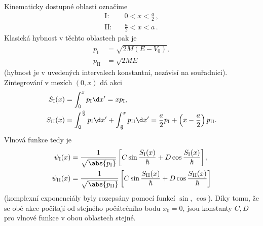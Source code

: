 \begin{solution}
	Kinematicky dostupné oblasti označíme
	\begin{align}
		\text{I:} & \quad 0<x<\frac{a}{2}\,, \nonumber\\
		\text{II:} & \quad \frac{a}{2}<x<a\,.\nonumber
	\end{align}
	Klasická hybnost v těchto oblastech pak je
    \begin{subequations}
        \begin{align}
            p_{\mathrm{I}}&=\sqrt{2M\left(E-V_{0}\right)},\\
            p_{\mathrm{II}}&=\sqrt{2ME}
        \end{align}            
    \end{subequations}
	(hybnost je v uvedených intervalech konstantní, nezávisí na souřadnici).
	Zintegrování v mezích $(0,x)$ dá akci
    \begin{subequations}
        \begin{align}
            S_{\mathrm{I}}(x)&=\int_{0}^{x}p_{\mathrm{I}}\d x'=xp_{\mathrm{I}},\\
            S_{\mathrm{II}}(x)
                &=\int_{0}^{\frac{a}{2}}p_{\mathrm{I}}\d x'+\int_{\frac{a}{2}}^{x}p_{\mathrm{II}}\d x'=\frac{a}{2}p_{\mathrm{I}}+\left(x-\frac{a}{2}\right)p_{\mathrm{II}}.
        \end{align}            
    \end{subequations}
	Vlnová funkce tedy je
    \begin{subequations}
        \begin{align}
            \psi_{\mathrm{I}}(x)&=\frac{1}{\sqrt{\abs{p_{\mathrm{I}}}}}\left[C\sin{\frac{S_{\mathrm{I}}(x)}{\hbar}}+D\cos{\frac{S_{\mathrm{I}}(x)}{\hbar}}\right],\\
            \psi_{\mathrm{II}}(x)&=\frac{1}{\sqrt{\abs{p_{\mathrm{II}}}}}\left[C\sin{\frac{S_{\mathrm{II}}(x)}{\hbar}}+D\cos{\frac{S_{\mathrm{II}}(x)}{\hbar}}\right]
        \end{align}            
    \end{subequations}
	(komplexní exponenciály byly rozepsány pomocí funkcí $\sin$, $\cos$).
	Díky tomu, že se obě akce počítají od stejného počátečního bodu $x_{0}=0$, jsou konstanty $C,D$ pro vlnové funkce v obou oblastech stejné.
	

\end{solution}
